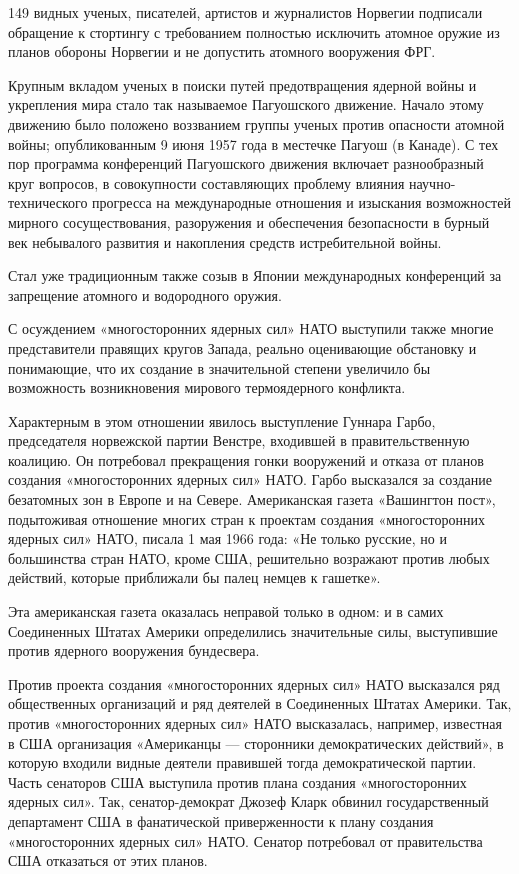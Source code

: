 \documentclass[12pt, a4paper, openany]{book}
\begin{document}
	149 видных ученых, писателей, артистов и журналистов Норвегии подписали обращение к стортингу с требованием полностью исключить атомное оружие из планов обороны Норвегии и не допустить атомного вооружения ФРГ.
	
	Крупным вкладом ученых в поиски путей предотвращения ядерной войны и укрепления мира стало так называемое Пагуошского движение. Начало этому движению было положено воззванием группы ученых против опасности атомной войны; опубликованным 9 июня 1957 года в местечке Пагуош (в Канаде). С тех пор программа конференций Пагуошского движения включает разнообразный круг вопросов, в совокупности составляющих проблему влияния научно-технического прогресса на международные отношения и изыскания возможностей мирного сосуществования, разоружения и обеспечения безопасности в бурный век небывалого развития и накопления средств истребительной войны.
	
	Стал уже традиционным также созыв в Японии международных конференций за запрещение атомного и водородного оружия.
	
	С осуждением «многосторонних ядерных сил» НАТО выступили также многие представители правящих кругов Запада, реально оценивающие обстановку и понимающие, что их создание в значительной степени увеличило бы возможность возникновения мирового термоядерного конфликта.
	
	Характерным в этом отношении явилось выступление Гуннара Гарбо, председателя норвежской партии Венстре, входившей в правительственную коалицию. Он потребовал прекращения гонки вооружений и отказа от планов создания «многосторонних ядерных сил» НАТО. Гарбо высказался за создание безатомных зон в Европе и на Севере. Американская газета «Вашингтон пост», подытоживая отношение многих стран к проектам создания «многосторонних ядерных сил» НАТО, писала 1 мая 1966 года: «Не только русские, но и большинства стран НАТО, кроме США, решительно возражают против любых действий, которые приближали бы палец немцев к гашетке».
	
	Эта американская газета оказалась неправой только в одном: и в самих Соединенных Штатах Америки определились значительные силы, выступившие против ядерного вооружения бундесвера.
	
	Против проекта создания «многосторонних ядерных сил» НАТО высказался ряд общественных организаций и ряд деятелей в Соединенных Штатах Америки. Так, против «многосторонних ядерных сил» НАТО высказалась, например, известная в США организация «Американцы — сторонники демократических действий», в которую входили видные деятели правившей тогда демократической партии. Часть сенаторов США выступила против плана создания «многосторонних ядерных сил». Так, сенатор-демократ Джозеф Кларк обвинил государственный департамент США в фанатической приверженности к плану создания «многосторонних ядерных сил» НАТО. Сенатор потребовал от правительства США отказаться от этих планов.
	
\end{document}
